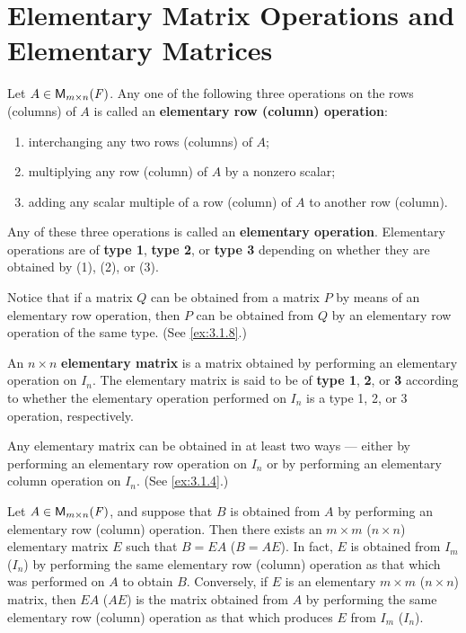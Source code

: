 \section{Elementary Matrix Operations and Elementary Matrices}\label{sec:3.1}

\begin{defn}\label{3.1.1}
	Let \(A \in \ms\).
	Any one of the following three operations on the rows (columns) of \(A\) is called an \textbf{elementary row (column) operation}:
	\begin{enumerate}[label=(\arabic*)]
		\item interchanging any two rows (columns) of \(A\);
		\item multiplying any row (column) of \(A\) by a nonzero scalar;
		\item adding any scalar multiple of a row (column) of \(A\) to another row (column).
	\end{enumerate}
	Any of these three operations is called an \textbf{elementary operation}.
	Elementary operations are of \textbf{type 1}, \textbf{type 2}, or \textbf{type 3} depending on whether they are obtained by (1), (2), or (3).
\end{defn}

\begin{note}
	Notice that if a matrix \(Q\) can be obtained from a matrix \(P\) by means of an elementary row operation, then \(P\) can be obtained from \(Q\) by an elementary row operation of the same type.
	(See \cref{ex:3.1.8}.)
\end{note}

\begin{defn}\label{3.1.2}
	An \(n \times n\) \textbf{elementary matrix} is a matrix obtained by performing an elementary operation on \(I_n\).
	The elementary matrix is said to be of \textbf{type 1}, \textbf{2}, or \textbf{3} according to whether the elementary operation performed on \(I_n\) is a type 1, 2, or 3 operation, respectively.
\end{defn}

\begin{note}
	Any elementary matrix can be obtained in at least two ways ---
	either by performing an elementary row operation on \(I_n\) or by performing an elementary column operation on \(I_n\).
	(See \cref{ex:3.1.4}.)
\end{note}

\begin{thm}\label{3.1}
	Let \(A \in \ms\), and suppose that \(B\) is obtained from \(A\) by performing an elementary row (column) operation.
	Then there exists an \(m \times m\) (\(n \times n\)) elementary matrix \(E\) such that \(B = EA\) (\(B = AE\)).
	In fact, \(E\) is obtained from \(I_m\) (\(I_n\)) by performing the same elementary row (column) operation as that which was performed on \(A\) to obtain \(B\).
	Conversely, if \(E\) is an elementary \(m \times m\) (\(n \times n\)) matrix, then \(EA\) (\(AE\)) is the matrix obtained from \(A\) by performing the same elementary row (column) operation as that which produces \(E\) from \(I_m\) (\(I_n\)).
\end{thm}

